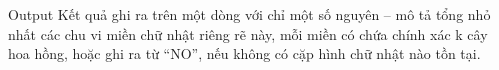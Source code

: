 Output
Kết quả ghi ra trên một dòng với chỉ một số nguyên – mô tả tổng nhỏ nhất các chu vi miền chữ nhật riêng rẽ này, mỗi miền có chứa chính xác k cây hoa hồng, hoặc ghi ra từ “NO”, nếu không có cặp hình chữ nhật nào tồn tại.
